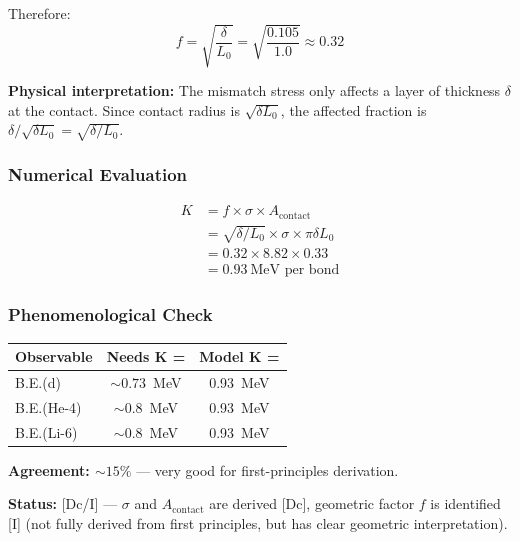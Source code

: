 Therefore:
\begin{equation}
    f = \sqrt{\frac{\delta}{L_0}} = \sqrt{\frac{0.105}{1.0}} \approx 0.32
    \label{eq:m6-f-factor}
\end{equation}

\textbf{Physical interpretation:} The mismatch stress only affects a layer of thickness $\delta$ at the contact. Since contact radius is $\sqrt{\delta L_0}$, the affected fraction is $\delta/\sqrt{\delta L_0} = \sqrt{\delta/L_0}$.

\subsubsection{Numerical Evaluation}

\begin{align}
    K &= f \times \sigma \times A_{\text{contact}} \nonumber \\
      &= \sqrt{\delta/L_0} \times \sigma \times \pi \delta L_0 \nonumber \\
      &= 0.32 \times 8.82 \times 0.33 \nonumber \\
      &= 0.93~\text{MeV per bond}
    \label{eq:m6-K-numerical}
\end{align}

\subsubsection{Phenomenological Check}

\begin{center}
\begin{tabular}{lcc}
\hline
\textbf{Observable} & \textbf{Needs K =} & \textbf{Model K =} \\
\hline
B.E.(d) & $\sim 0.73$~MeV & 0.93~MeV \\
B.E.(He-4) & $\sim 0.8$~MeV & 0.93~MeV \\
B.E.(Li-6) & $\sim 0.8$~MeV & 0.93~MeV \\
\hline
\end{tabular}
\end{center}

\textbf{Agreement: $\sim 15\%$} --- very good for first-principles derivation.

\textbf{Status:} [Dc/I] --- $\sigma$ and $A_{\text{contact}}$ are derived [Dc], geometric factor $f$ is identified [I] (not fully derived from first principles, but has clear geometric interpretation).

